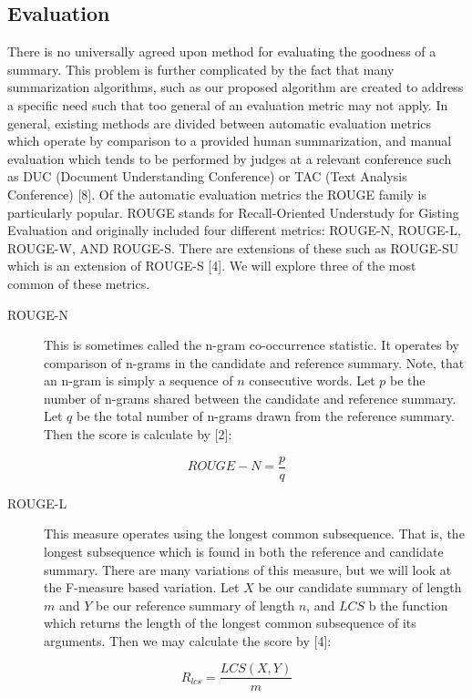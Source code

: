 \documentclass[11pt]{article}
\begin{document}
\subsection{Evaluation}
\label{sec:org29ecde1}
There is no universally agreed upon method for evaluating the goodness of a summary. This problem is further complicated by the fact that many summarization algorithms, such as our proposed algorithm are created to address a specific need such that too general of an evaluation metric may not apply. In general, existing methods are divided between automatic evaluation metrics which operate by comparison to a provided human summarization, and manual evaluation which tends to be performed by judges at a relevant conference such as DUC (Document Understanding Conference) or TAC (Text Analysis Conference) [8]. Of the automatic evaluation metrics the ROUGE family is particularly popular. ROUGE stands for Recall-Oriented Understudy for Gisting Evaluation and originally included four different metrics: ROUGE-N, ROUGE-L, ROUGE-W, AND ROUGE-S. There are extensions of these such as ROUGE-SU which is an extension of ROUGE-S [4]. We will explore three of the most common of these metrics.
\begin{description}
\item[{ROUGE-N}] This is sometimes called the n-gram co-occurrence statistic. It operates by comparison of n-grams in the candidate and reference summary. Note, that an n-gram is simply a sequence of \(n\) consecutive words. Let \(p\) be the number of n-grams shared between the candidate and reference summary. Let \(q\) be the total number of n-grams drawn from the reference summary. Then the score is calculate by [2]:
\end{description}
\begin{equation}
ROUGE-N = \frac{p}{q}
\end{equation}
\begin{description}
\item[{ROUGE-L}] This measure operates using the longest common subsequence. That is, the longest subsequence which is found in both the reference and candidate summary. There are many variations of this measure, but we will look at the F-measure based variation. Let \(X\) be our candidate summary of length \(m\) and \(Y\) be our reference summary of length \(n\), and \(LCS\) b the function which returns the length of the longest common subsequence of its arguments. Then we may calculate the score by [4]:
\end{description}
\begin{equation}
R_{lcs}=\frac{LCS(X,Y)}{m}
\end{equation}
\end{document}
